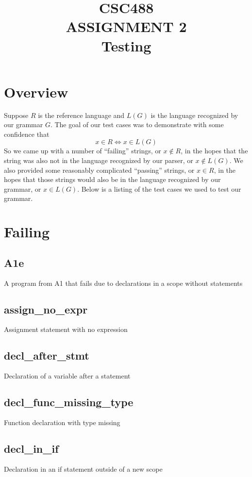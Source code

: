 \documentclass[oneside]{amsart}
\theoremstyle{definition}
\theoremstyle{remark}
\numberwithin{equation}{section}
\begin{document}
\title[CSC488 A2]{CSC488\\ASSIGNMENT 2\\Testing}

\maketitle
\thispagestyle{empty}
\tableofcontents

\section{Overview}
Suppose $R$ is the reference language and $L(G)$ is the language recognized by our grammar $G$. The
goal of our test cases was to demonstrate with some confidence that
\[x \in R \iff x \in L(G)\]
So we came up with a number of ``failing'' strings, or $x \not\in R$, in the hopes that the string
was also not in the language recognized by our parser, or $x \not\in L(G)$. We also provided some
reasonably complicated ``passing'' strings, or $x \in R$, in the hopes that those strings would also
be in the language recognized by our grammar, or $x \in L(G)$. Below is a listing of the test cases
we used to test our grammar.

\section{Failing}
\subsection{A1e} A program from A1 that fails due to declarations in a scope without statements
\subsection{assign\_no\_expr} Assignment statement with no expression
\subsection{decl\_after\_stmt} Declaration of a variable after a statement
\subsection{decl\_func\_missing\_type} Function declaration with type missing
\subsection{decl\_in\_if} Declaration in an if statement outside of a new scope
\end{document}
